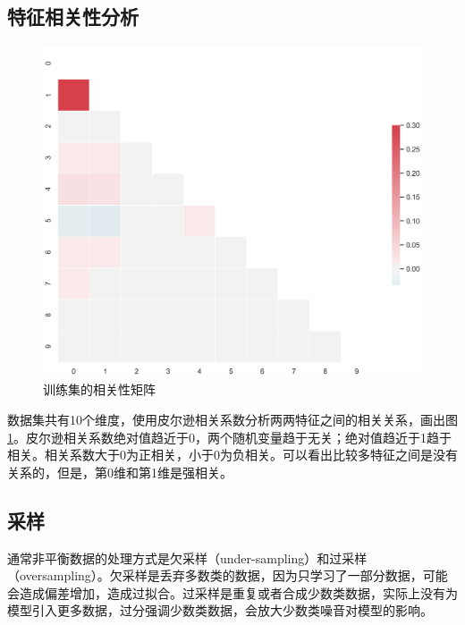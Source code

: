 \documentclass[a4paper]{article}
\begin{document}
\subsection{特征相关性分析}

\begin{figure}[!h]
    \centering
    \includegraphics[width=0.6\linewidth]{train_corr2.png}
    \caption{训练集的相关性矩阵}
    \label{fig:corr}
\end{figure}

数据集共有10个维度，使用皮尔逊相关系数分析两两特征之间的相关关系，画出图\ref{fig:corr}。皮尔逊相关系数绝对值趋近于0，两个随机变量趋于无关；绝对值趋近于1趋于相关。相关系数大于0为正相关，小于0为负相关。可以看出比较多特征之间是没有关系的，但是，第0维和第1维是强相关。

\subsection{采样}

通常非平衡数据的处理方式是欠采样（under-sampling）和过采样（oversampling）。欠采样是丢弃多数类的数据，因为只学习了一部分数据，可能会造成偏差增加，造成过拟合。过采样是重复或者合成少数类数据，实际上没有为模型引入更多数据，过分强调少数类数据，会放大少数类噪音对模型的影响。
\end{document}
